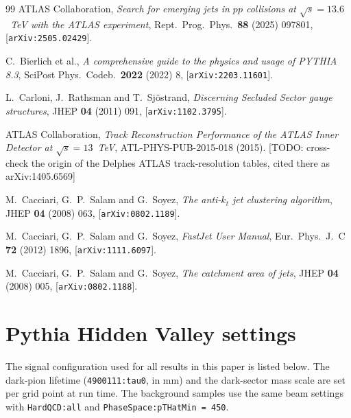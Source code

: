 \documentclass[a4paper,11pt]{article}
\newcommand{\todo}[1]{{\color{red!70!black}[TODO: #1]}}
\begin{document}
\begin{thebibliography}{99}
ATLAS Collaboration,
\emph{Search for emerging jets in $pp$ collisions at $\sqrt{s} = 13.6$~TeV
with the ATLAS experiment},
Rept.\ Prog.\ Phys.\ \textbf{88} (2025) 097801,
[\texttt{arXiv:2505.02429}].

C.~Bierlich et al.,
\emph{A comprehensive guide to the physics and usage of PYTHIA 8.3},
SciPost Phys.\ Codeb.\ \textbf{2022} (2022) 8,
[\texttt{arXiv:2203.11601}].

L.~Carloni, J.~Rathsman and T.~Sj\"ostrand,
\emph{Discerning Secluded Sector gauge structures},
JHEP \textbf{04} (2011) 091, [\texttt{arXiv:1102.3795}].

ATLAS Collaboration,
\emph{Track Reconstruction Performance of the ATLAS Inner Detector at
$\sqrt{s} = 13$~TeV},
ATL-PHYS-PUB-2015-018 (2015).
\todo{cross-check the origin of the Delphes ATLAS track-resolution
tables, cited there as arXiv:1405.6569}

M.~Cacciari, G.~P.~Salam and G.~Soyez,
\emph{The anti-$k_t$ jet clustering algorithm},
JHEP \textbf{04} (2008) 063, [\texttt{arXiv:0802.1189}].

M.~Cacciari, G.~P.~Salam and G.~Soyez,
\emph{FastJet User Manual},
Eur.\ Phys.\ J.\ C \textbf{72} (2012) 1896, [\texttt{arXiv:1111.6097}].

M.~Cacciari, G.~P.~Salam and G.~Soyez,
\emph{The catchment area of jets},
JHEP \textbf{04} (2008) 005, [\texttt{arXiv:0802.1188}].

\end{thebibliography}

\appendix

\section{Pythia Hidden Valley settings}
\label{app:settings}

The signal configuration used for all results in this paper is listed
below. The dark-pion lifetime (\texttt{4900111:tau0}, in mm) and the
dark-sector mass scale are set per grid point at run time. The background samples use the same beam settings with
\texttt{HardQCD:all} and \texttt{PhaseSpace:pTHatMin = 450}.
\end{document}
